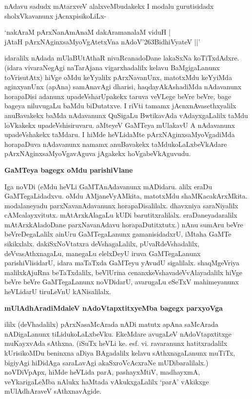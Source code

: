 \noindent
nAdavu sadudx mAtarxveV alalxveMbudakekx I modalu gurutisidadx sholxVkavanunx jAcnxpisikoLiLx-

\begin{shloka}
`nakAraM pArxNanAmAnaM dakAramanalaM viduH |\\\label{170}
jAtaH pArxNAginxsaMyoVgAtetxVna nAdoV\char'263BidhiVyateV ||'
\end{shloka}

idaralilx nAdada mUlaBUtAthaR nivaRcanadoDane lakaSxNa koTiTxdAdxre. (idara vivaraNegAgi naTa\-rAjana vigarxhadalilx kelavu BaMgigaLanunx toVrisutAtx) hiVge oMdu keYyalilx pArxNavanUnx, matotxMdu keYyiMda aginxyanUnx (apAna) samAnavAgi dharisi, haqdayAkAshadiMda nAdavanunx horapaDisi adanunx\- upadeVsharUpakekx taruva veVLege beVre beVre, bage bageya niluvugaLu baMdu biDutatxve. I riVti tamamx jAcnxnAvasethxyalilx anuBavakekx baMda nAdavanunx QuSigaLu BwtikavAda vAdayxgaLalilx taMdu loVkakekx upadeVshi\-siruvaru. aMteyeV GaMTeya mUlakavU A nAdavanunx upadeVshakekx taMdaru. I hiMde heVLi\-daMte pArxNAginxsaMyoVgadiMda horapaDuva nAdavanunx namamx anuBavakekx taMdukoLaLxbeVkAdare pArxNAginx\-saMyoVgavAguva jAgakekx hoVgabeVkAguvudu.

{\bigskip
\noindent
{\large\bf GaMTeya bagegx oMdu parishiVlane}}\label{page170}
\medskip

\noindent
Iga noVDi (eMdu heVLi GaMTAnAdavanunx mADidaru. alilx eraDu GaMTegaLidadxvu. oMdu AMjaneVyAMkita, matotxMdu shaMKacakArxMkita. modalaneyadu parxNavanAdavanunx horapaDisalilalx. dhavxniya saraNiyalilx cAMcalayxvitutx. mAtArxkAlagaLu kUDi barutitxralilalx. eraDaneyadaralilx mAtArxkAla\-doDane parxNavanAdavu horapaDutitxtutx.) nAnu sumAru beVre beVreDegaLalilx ainUru GaMTegaLanunx gamanisi\-dadxrU, iMtaha GaMTe sikikxlalx. dakiSxNoVtatxra deVshagaLalilx, pUvaRdeVshadalilx, deVvasAthxnagaLu, mane\-gaLu elelxDeyU iruva GaMTegaLanunx parishiVlisidarU, idara maTaTxda GaMTeyu yAvudU sigalilalx. shaqMgeVriya malilxkAjuRna beTaTxdalilx, beVlUrina cenanxkeVshavadeVvAlayadalilx hiVge beVre beVre GaMTe\-gaLanunx noVDidarU, avarugaLu eSeTxV mahimeyanunx heVLidarU tiruLeVnU kANisalilalx.

\eject

{\bigskip
\noindent
{\large\bf mUlAdhAradiMdaleV nAdoVtapxtitxyeMba bagegx parxyoVga}}\label{page171}
\medskip

\noindent
ililx (deVhadalilx) pArxNasaMcArada nADi matutx apAna saMcArada nADigaLanunx tiLidukoLaLx\-beVku. EkeMdare avugaLeV nAdoVtapxtitxge muKayxvAda sAthxna. (iSuTx heVLi ke. esf. vi. ravaranunx hatitxra\-dalilx kUrisikoMDu beninxna aDiya BAgadalilx kelavu sAthxnagaLanunx muTiTx, bigiyAgi hiDidAga saraLa\-vAgi akaSxroVcAcxraNe mUDibaralilalx.) noVDiVpApx, hiMde heVLida parA, pashayxMtiV, madhayxmA, veYkari\-gaLeMba nAlukx haMtada vAkukxgaLalilx `parA' vAkikxge mUlAdhAraveV sAthxnavAgide.

